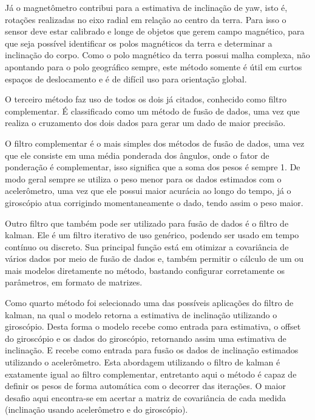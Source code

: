 Já o magnetômetro contribui para a estimativa de inclinação de yaw, isto é, rotações realizadas no eixo radial em relação ao centro da terra. Para isso o sensor deve estar calibrado e longe de objetos que gerem campo magnético, para que seja possível identificar os polos magnéticos da terra e determinar a inclinação do corpo. Como o polo magnético da terra possui malha complexa, não apontando para o polo geográfico sempre, este método somente é útil em curtos espaços de deslocamento e é de difícil uso para orientação global. \cite{ozyagcilar_implementing_nodate, bleything_how_nodate}

O terceiro método faz uso de todos os dois já citados, conhecido como filtro complementar. É classificado como um método de fusão de dados, uma vez que realiza o cruzamento dos dois dados para gerar um dado de maior precisão.

O filtro complementar é o mais simples dos métodos de fusão de dados, uma vez que ele consiste em uma média ponderada dos ângulos, onde o fator de ponderação é complementar, isso significa que a soma dos pesos é sempre 1. De modo geral sempre se utiliza o peso menor para os dados estimados com o acelerômetro, uma vez que ele possui maior acurácia ao longo do tempo, já o giroscópio atua corrigindo momentaneamente o dado, tendo assim o peso maior. \cite{brian_douglas_drone_2018, matlab_understanding_2019-1}

Outro filtro que também pode ser utilizado para fusão de dados é o filtro de kalman. Ele é um filtro iterativo de uso genérico, podendo ser usado em tempo contínuo ou discreto. Sua principal função está em otimizar a covariância de vários dados por meio de fusão de dados e, também permitir o cálculo de um ou mais modelos diretamente no método, bastando configurar corretamente os parâmetros, em formato de matrizes. \cite{aguirre_filtro_2019, matlab_understanding_2017}

Como quarto método foi selecionado uma das possíveis aplicações do filtro de kalman, na qual o modelo retorna a estimativa de inclinação utilizando o giroscópio. Desta forma o modelo recebe como entrada para estimativa, o offset do giroscópio e os dados do giroscópio, retornando assim uma estimativa de inclinação. E recebe como entrada para fusão os dados de inclinação estimados utilizando o acelerômetro. Esta abordagem utilizando o filtro de kalman é exatamente igual ao filtro complementar, entretanto aqui o método é capaz de definir os pesos de forma automática com o decorrer das iterações. O maior desafio aqui encontra-se em acertar a matriz de covariância de cada medida (inclinação usando acelerômetro e do giroscópio). \cite{kelly_kalman_2017, ferdinando_embedded_2012}

